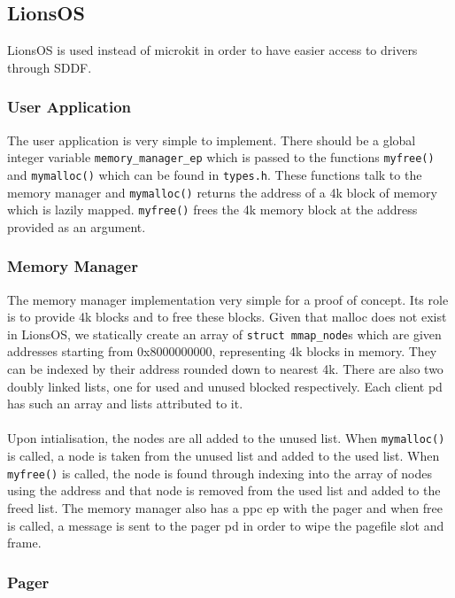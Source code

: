 \documentclass[../thesis.tex]{subfiles}
\begin{document}
\subsection{LionsOS}
LionsOS is used instead of microkit in order to have easier access to drivers through SDDF. 
\subsubsection{User Application}
The user application is very simple to implement. There should be a global integer variable \texttt{memory\_manager\_ep} which is passed to the functions \texttt{myfree()} and \texttt{mymalloc()} which can be found in \texttt{types.h}. These functions talk to the memory manager and \texttt{mymalloc()} returns the address of a 4k block of memory which is lazily mapped. \texttt{myfree()} frees the 4k memory block at the address provided as an argument.
\subsubsection{Memory Manager}
The memory manager implementation very simple for a proof of concept. Its role is to provide 4k blocks and to free these blocks. Given that malloc does not exist in LionsOS, we statically create an array of \texttt{struct mmap\_node}s which are given addresses starting from 0x8000000000, representing 4k blocks in memory. They can be indexed by their address rounded down to nearest 4k. There are also two doubly linked lists, one for used and unused blocked respectively. Each client \gls{pd} has such an array and lists attributed to it.
\\\\
Upon intialisation, the nodes are all added to the unused list. When \texttt{mymalloc()} is called, a node is taken from the unused list and added to the used list. When \texttt{myfree()} is called, the node is found through indexing into the array of nodes using the address and that node is removed from the used list and added to the freed list. The memory manager also has a ppc ep with the pager and when free is called, a message is sent to the pager \gls{pd} in order to wipe the pagefile slot and frame.
\subsubsection{Pager}
\end{document}
